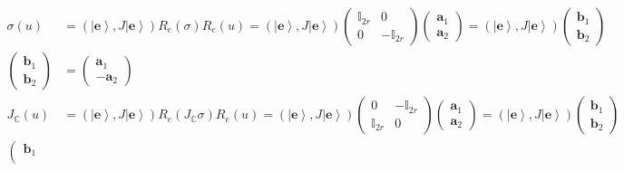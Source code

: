 \documentclass[aps,preprint]{revtex4}
\begin{document}
\begin{align}
\mathcal{\sigma}\left( u\right) & =\left( \left\vert \mathbf{e}\right\rangle
,J\left\vert \mathbf{e}\right\rangle \right) R_{e}\left( \sigma\right)
R_{e}\left( u\right) =\left( \left\vert \mathbf{e}\right\rangle ,J\left\vert 
\mathbf{e}\right\rangle \right) \left( 
\begin{array}{cc}
\mathbb{I}_{2r} & 0 \\ 
0 & -\mathbb{I}_{2r}%
\end{array}
\right) \left( 
\begin{array}{c}
\mathbf{a}_{1} \\ 
\mathbf{a}_{2}%
\end{array}
\right) =\left( \left\vert \mathbf{e}\right\rangle ,J\left\vert \mathbf{e}%
\right\rangle \right) \left( 
\begin{array}{c}
\mathbf{b}_{1} \\ 
\mathbf{b}_{2}%
\end{array}
\right) \\
\left( 
\begin{array}{c}
\mathbf{b}_{1} \\ 
\mathbf{b}_{2}%
\end{array}
\right) & =\left( 
\begin{array}{c}
\mathbf{a}_{1} \\ 
-\mathbf{a}_{2}%
\end{array}
\right) \\
J_{\mathbb{C}}\left( u\right) & =\left( \left\vert \mathbf{e}\right\rangle
,J\left\vert \mathbf{e}\right\rangle \right) R_{e}\left( J_{\mathbb{C}%
}\sigma\right) R_{e}\left( u\right) =\left( \left\vert \mathbf{e}%
\right\rangle ,J\left\vert \mathbf{e}\right\rangle \right) \left( 
\begin{array}{cc}
0 & -\mathbb{I}_{2r} \\ 
\mathbb{I}_{2r} & 0%
\end{array}
\right) \left( 
\begin{array}{c}
\mathbf{a}_{1} \\ 
\mathbf{a}_{2}%
\end{array}
\right) =\left( \left\vert \mathbf{e}\right\rangle ,J\left\vert \mathbf{e}%
\right\rangle \right) \left( 
\begin{array}{c}
\mathbf{b}_{1} \\ 
\mathbf{b}_{2}%
\end{array}
\right) \\
\left( 
\begin{array}{c}
\mathbf{b}_{1} \\ 

\end{array}
\end{align}
\end{document}
